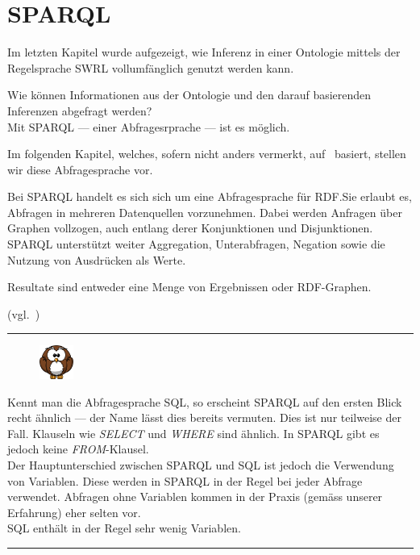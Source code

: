 \chapter{SPARQL}
\label{chap:sparql}
Im letzten Kapitel wurde aufgezeigt, wie Inferenz in einer Ontologie mittels der Regelsprache SWRL vollumfänglich genutzt werden kann.

Wie können Informationen aus der Ontologie und den darauf basierenden Inferenzen abgefragt werden?\\
Mit SPARQL --- einer Abfragesrprache --- ist es möglich.

Im folgenden Kapitel, welches, sofern nicht anders vermerkt, auf~\cite{w3sparql_querylang} basiert, stellen wir diese Abfragesprache vor.

Bei SPARQL handelt es sich sich um eine Abfragesprache für RDF.\@ Sie erlaubt es, Abfragen in mehreren Datenquellen vorzunehmen. Dabei werden Anfragen über Graphen vollzogen, auch entlang derer Konjunktionen und Disjunktionen. SPARQL unterstützt weiter Aggregation, Unterabfragen, Negation sowie die Nutzung von Ausdrücken als Werte.

Resultate sind entweder eine Menge von Ergebnissen oder RDF-Graphen.

(vgl.~\cite[Abstract]{w3sparql_querylang})

\noindent\rule[1ex]{\textwidth}{1pt}
\begin{figure}
    \vspace{-12pt}
    \includegraphics[width=0.1\textwidth]{bilder/owl.png}
\end{figure}
Kennt man die Abfragesprache SQL, so erscheint SPARQL auf den ersten Blick recht ähnlich --- der Name lässt dies bereits vermuten. Dies ist nur teilweise der Fall. Klauseln wie \textit{SELECT} und \textit{WHERE} sind ähnlich. In SPARQL gibt es jedoch keine \textit{FROM}-Klausel.\\
Der Hauptunterschied zwischen SPARQL und SQL ist jedoch die Verwendung von Variablen.  Diese werden in SPARQL in der Regel  bei jeder Abfrage verwendet. Abfragen ohne Variablen kommen in der Praxis (gemäss unserer Erfahrung) eher selten vor.\\
SQL enthält in der Regel sehr wenig Variablen.

\noindent\rule[1ex]{\textwidth}{1pt}

